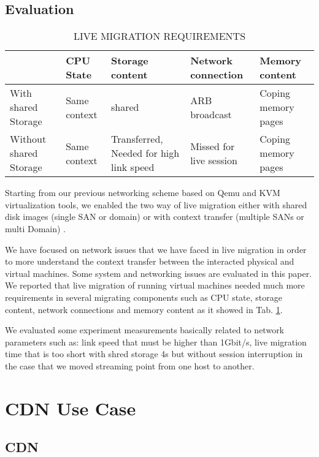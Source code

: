 \documentclass[letterpaper,conference]{IEEEtran}
\begin{document}
\subsection{Evaluation}

\begin{table}[!b]
\caption{LIVE MIGRATION REQUIREMENTS}
\label{1}
{\fontsize{8pt}{8pt}\selectfont
\renewcommand{\arraystretch}{1.3}
\begin{center}
\begin{tabular}{ |p{1cm}| p{1cm}|p{1.2cm}|p{1cm}|p{1cm}|}
\hline  & CPU State & Storage content &Network connection &Memory content \\
\hline With shared Storage& Same context & shared &ARB broadcast &Coping memory pages \\
\hline Without shared Storage&Same context & Transferred, Needed for high link speed &Missed for live session &Coping
memory pages \\
\hline
\end{tabular}
\end{center}
}
\end{table}

Starting from our previous networking scheme based on
Qemu and KVM virtualization tools, we enabled the two way of live migration either with shared disk images (single SAN or domain) or with context transfer (multiple SANs or multi Domain) .

We have focused on network issues that we have faced in live migration in order to more understand the context transfer between the interacted physical and virtual machines. Some system and networking issues are evaluated in this paper. We reported that live migration of running virtual machines needed much more requirements in several migrating components such as CPU state, storage content, network connections and memory content as it showed in Tab. \ref{1}.

We evaluated some experiment measurements basically
related to network parameters such as: link speed that must be higher than 1Gbit/s, live migration time that is too short with shred storage 4s but without session interruption in the case that we moved streaming point from one host to another.


\section{CDN Use Case}

\subsection{CDN}
\end{document}

